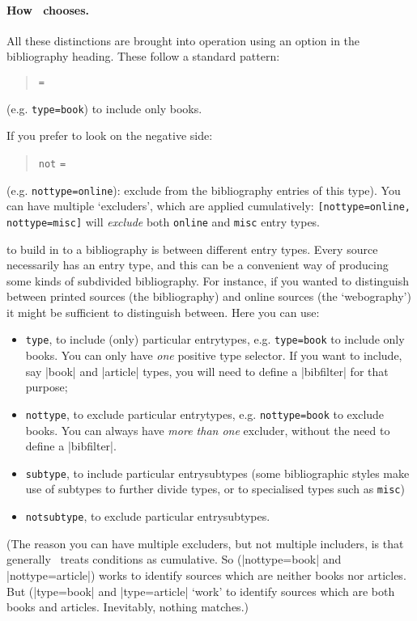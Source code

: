 \paragraph{How \biblatex\ chooses.} All these distinctions are brought
into operation using an option in the bibliography heading. These
follow a standard pattern:
\begin{quote}
 \texttt{=} 
\end{quote}
(e.g. \texttt{type=book}) to include only books.

If you prefer to look on the negative side:
\begin{quote}
\texttt{not} \texttt{=} 
\end{quote}
(e.g. \texttt{nottype=online}): exclude from the bibliography entries of
this type). You can have multiple `excluders', which are applied
cumulatively: \texttt{{[}nottype=online,} \texttt{nottype=misc{]}} will
\emph{exclude} both \texttt{online} and \texttt{misc} entry types.

 to build in to a bibliography
is between different entry types. Every source necessarily has an
entry type, and this can be a convenient way of producing some kinds
of subdivided bibliography. For instance, if you wanted to distinguish
between printed sources (the bibliography) and online sources (the
`webography') it might be sufficient to distinguish between. Here you
can use:
\begin{itemize}
\item \texttt{type}, to include (only) particular entrytypes, e.g.
  \texttt{type=book} to include only books. You can only have
  \emph{one} positive type selector. If you want to include, say
  |book| and |article| types, you will need to define a |bibfilter|
  for that purpose;
\item \texttt{nottype}, to exclude particular entrytypes,
  e.g. \texttt{nottype=book} to exclude books. You can always have
  \emph{more than one} excluder, without the need to define a
  |bibfilter|.
\item \texttt{subtype}, to include particular entrysubtypes (some
  bibliographic styles make use of subtypes to further divide types,
  or to specialised types such as \texttt{misc})
\item \texttt{notsubtype}, to exclude particular entrysubtypes.
\end{itemize}
(The reason you can have multiple excluders, but not multiple
includers, is that generally \biblatex\ treats conditions as
cumulative. So (|nottype=book| and |nottype=article|) works to
identify sources which are neither books nor articles. But
(|type=book| and |type=article| `work' to identify sources which are
both books and articles. Inevitably, nothing matches.)

